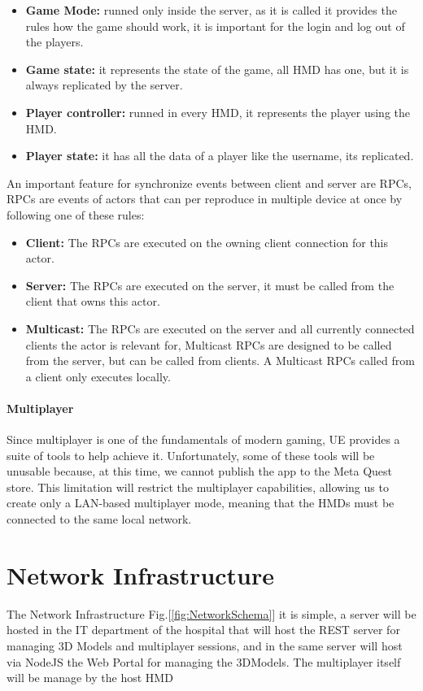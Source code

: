\begin{itemize}
  \item \textbf{Game Mode:} runned only inside the server, as it is called it provides the rules how the game should work, it is important for the login and log out of the players.
  \item \textbf{Game state:} it represents the state of the game, all \ac{HMD} has one, but it is always replicated by the server.
  \item \textbf{Player controller:} runned in every \ac{HMD}, it represents the player using the \ac{HMD}.
  \item \textbf{Player state:} it has all the data of a player like the username, its replicated.
\end{itemize}
\noindent
An important feature for synchronize events between client and server are \ac{RPCs}, \ac{RPCs} are events of actors that can per reproduce in multiple device at once by following one of these rules:
\begin{itemize}
  \item \textbf{Client:} The \ac{RPCs} are executed on the owning client connection for this actor.
  \item \textbf{Server:} The \ac{RPCs} are executed on the server, it must be called from the client that owns this actor.
  \item \textbf{Multicast:} The \ac{RPCs} are executed on the server and all currently connected clients the actor is relevant for, Multicast \ac{RPCs} are designed to be called from the server, but can be called from clients. A Multicast \ac{RPCs} called from a client only executes locally.
\end{itemize}

\paragraph{Multiplayer}
Since multiplayer is one of the fundamentals of modern gaming, \ac{UE} provides a suite of tools to help achieve it.
Unfortunately, some of these tools will be unusable because, at this time, we cannot publish the app to the Meta Quest store.
This limitation will restrict the multiplayer capabilities, allowing us to create only a LAN-based multiplayer mode, meaning that the \ac{HMD}s must be connected to the same local network.

\section{Network Infrastructure}
\noindent
The Network Infrastructure Fig.[\ref{fig:NetworkSchema}] it is simple, a server will be hosted in the IT department of the hospital that will host the \ac{REST} server for managing 3D Models and multiplayer sessions,
and in the same server will host via NodeJS the Web Portal for managing the 3DModels.
The multiplayer itself will be manage by the host \ac{HMD}

